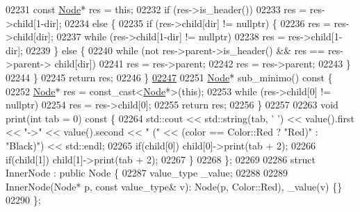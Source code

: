 \begin{DoxyCode}
02231             \textcolor{keyword}{const} \hyperlink{structaed2_1_1map_1_1Node_a9c1a600491066ce7eb669b1cb76d56c6_a9c1a600491066ce7eb669b1cb76d56c6}{Node}* res = \textcolor{keyword}{this};
02232             \textcolor{keywordflow}{if} (res->is\_header())
02233                 res = res->child[1-dir];
02234             \textcolor{keywordflow}{else} \{
02235                 if (res->child[dir] != \textcolor{keyword}{nullptr}) \{
02236                     res = res->child[dir];
02237                     \textcolor{keywordflow}{while} (res->child[1-dir] != \textcolor{keyword}{nullptr})
02238                         res = res->child[1-dir];
02239                 \} \textcolor{keywordflow}{else} \{
02240                     \textcolor{keywordflow}{while} (not res->parent->is\_header() && res == res->parent->
      child[dir])
02241                         res = res->parent;
02242                     res = res->parent;
02243                 \}
02244             \}
02245             \textcolor{keywordflow}{return} res;
02246         \}
\hypertarget{map_8h_source_l02247}{}\hyperlink{structaed2_1_1map_1_1Node_ae3420a3dca910d193089461151b8dc4e_ae3420a3dca910d193089461151b8dc4e}{02247} 
02251         \hyperlink{structaed2_1_1map_1_1Node}{Node}* sub\_minimo()\textcolor{keyword}{ const }\{
02252             \hyperlink{structaed2_1_1map_1_1Node}{Node}* res = \textcolor{keyword}{const\_cast<}\hyperlink{structaed2_1_1map_1_1Node}{Node}*\textcolor{keyword}{>}(\textcolor{keyword}{this});
02253             \textcolor{keywordflow}{while} (res->child[0] != \textcolor{keyword}{nullptr})
02254                 res = res->child[0];
02255             \textcolor{keywordflow}{return} res;
02256         \}
02257 
02263         \textcolor{keywordtype}{void} print(\textcolor{keywordtype}{int} tab = 0)\textcolor{keyword}{ const }\{
02264             std::cout << std::string(tab, \textcolor{charliteral}{' '}) << value().first << \textcolor{stringliteral}{"->"} << 
      value().second << \textcolor{stringliteral}{"   ("} << (color == Color::Red ? \textcolor{stringliteral}{"Red)"} : \textcolor{stringliteral}{"Black)"}) << std::endl;
02265             \textcolor{keywordflow}{if}(child[0]) child[0]->print(tab + 2);
02266             \textcolor{keywordflow}{if}(child[1]) child[1]->print(tab + 2);
02267         \}
02268     \};
02269 
02286     \textcolor{keyword}{struct }InnerNode : \textcolor{keyword}{public} Node \{
02287         value\_type \_value;
02288 
02289         InnerNode(Node* p, \textcolor{keyword}{const} value\_type& v): Node(p, Color::Red), \_value(v)
       \{\}
02290     \};

\end{DoxyCode}
